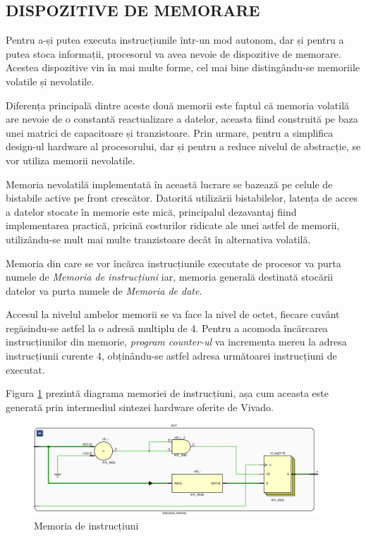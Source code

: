 \documentclass[12pt]{article}
\begin{document}
 \subsection{DISPOZITIVE DE MEMORARE}
 	Pentru a-și putea executa instrucțiunile într-un mod autonom, dar și pentru a putea stoca informații, procesorul va avea nevoie de dispozitive de memorare. Acestea dispozitive vin în mai multe forme, cel mai bine distingându-se memoriile volatile și nevolatile.
 	
 	 Diferența principală dintre aceste două memorii este faptul că memoria volatilă are nevoie de o constantă reactualizare a datelor, aceasta fiind construită pe baza unei matrici de capacitoare și tranzistoare. Prin urmare, pentru a simplifica design-ul hardware al procesorului, dar și pentru a reduce nivelul de abstracție, se vor utiliza memorii nevolatile.
 	 
 	 Memoria nevolatilă implementată în această lucrare se bazează pe celule de bistabile active pe front crescător. Datorită utilizării bistabilelor, latența de acces a datelor stocate în memorie este mică, principalul dezavantaj fiind implementarea practică, pricină costurilor ridicate ale unei astfel de memorii, utilizându-se mult mai multe tranzistoare decât în alternativa volatilă.
 	 
 	 Memoria din care se vor încărca instrucțiunile executate de procesor va purta numele de \textit{Memoria de instrucțiuni} iar, memoria generală destinată stocării datelor va purta numele de \textit{Memoria de date}.
 	 
	Accesul la nivelul ambelor memorii se va face la nivel de octet, fiecare cuvânt regăsindu-se astfel la o adresă multiplu de 4. Pentru a acomoda încărcarea instrucțiunilor din memorie, \textit{program counter-ul} va incrementa mereu la adresa instrucțiunii curente 4, obținându-se astfel adresa următoarei instrucțiuni de executat.
	
	Figura \ref{Figura:30} prezintă diagrama memoriei de instrucțiuni, așa cum aceasta este generată prin intermediul sintezei hardware oferite de Vivado.
	
\begin{figure}[h!]
 \includegraphics[width=0.95\textwidth]{instmem.png}
 \centering
 \caption{Memoria de instrucțiuni}
 \label{Figura:30}
 \end{figure}
 
\end{document}
